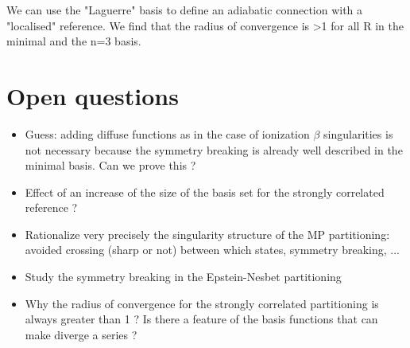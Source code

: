 \documentclass{article}
\begin{document}
We can use the "Laguerre" basis to define an adiabatic connection with a "localised" reference. We find that the radius of convergence is >1 for all R in the minimal and the n=3 basis. 

\section{Open questions}

\begin{itemize}
\item Guess: adding diffuse functions as in the case of ionization $\beta$ singularities is not necessary because the symmetry breaking is already well described in the minimal basis. Can we prove this ?
\item Effect of an increase of the size of the basis set for the strongly correlated reference ?
\item Rationalize very precisely the singularity structure of the MP partitioning: avoided crossing (sharp or not) between which states, symmetry breaking, ...
\item Study the symmetry breaking in the Epstein-Nesbet partitioning
\item Why the radius of convergence for the strongly correlated partitioning is always greater than 1 ? Is there a feature of the basis functions that can make diverge a series ?

\end{itemize}
\end{document}
